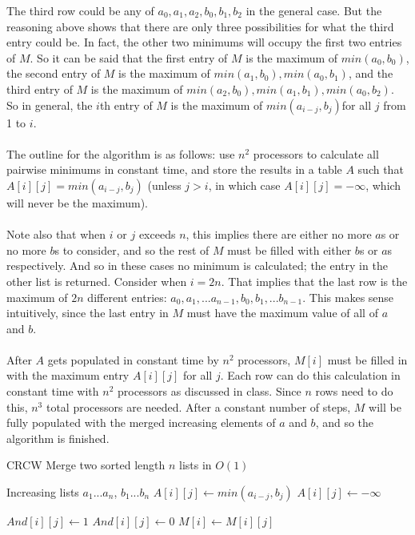 \documentclass[letterpaper,notitlepage,twoside]{article}
\begin{document}
The third row could be any of $a_0, a_1, a_2, b_0, b_1, b_2$ in the general case. But the reasoning above shows that there are only three possibilities for what the third entry could be. In fact, the other two minimums will occupy the first two entries of $M$. So it can be said that the first entry of $M$ is the maximum of $min(a_0, b_0)$, the second entry of $M$ is the maximum of $min(a_1, b_0), min(a_0, b_1)$, and the third entry of $M$ is the maximum of $min(a_2, b_0), min(a_1, b_1), min(a_0, b_2)$. So in general, the $i$th entry of $M$ is the maximum of $min(a_{i - j}, b_j)$for all $j$ from 1 to $i$.
\\\\
The outline for the algorithm is as follows: use $n^2$ processors to calculate all pairwise minimums in constant time, and store the results in a table $A$ such that $A[i][j] = min(a_{i - j}, b_j)$ (unless $j > i$, in which case $A[i][j] = -\infty$, which will never be the maximum).
\\\\
Note also that when $i$ or $j$ exceeds $n$, this implies there are either no more $a$s or no more $b$s to consider, and so the rest of $M$ must be filled with either $b$s or $a$s respectively. And so in these cases no minimum is calculated; the entry in the other list is returned. Consider when $i = 2n$. That implies that the last row is the maximum of $2n$ different entries: $a_0, a_1, ... a_{n - 1}, b_0, b_1, ... b_{n - 1}$. This makes sense intuitively, since the last entry in $M$ must have the maximum value of all of $a$ and $b$.
\\\\
After $A$ gets populated in constant time by $n^2$ processors, $M[i]$ must be filled in with the maximum entry $A[i][j]$ for all $j$. Each row can do this calculation in constant time with $n^2$ processors as discussed in class. Since $n$ rows need to do this, $n^3$ total processors are needed. After a constant number of steps, $M$ will be fully populated with the merged increasing elements of $a$ and $b$, and so the algorithm is finished.

\begin{algorithm}[H]
	\begin{algorithmic}%
		\caption{CRCW Merge two sorted length $n$ lists in $O(1)$}
		\Require Increasing lists $a_1...a_n$, $b_1...b_n$
			 
				\State $A[i][j] \gets min(a_{i - j}, b_j)$
			\Else
				\State $A[i][j] \gets -\infty$
			\EndIf
		
		\EndIf
		
		\State $And[i][j] \gets 1$ 
		 
			\State $And[i][j] \gets 0$ 
		\EndIf
		 
			\State $M[i] \gets M[i][j]$ 
		\EndIf
	\end{algorithmic}
\end{algorithm}
\end{document}
